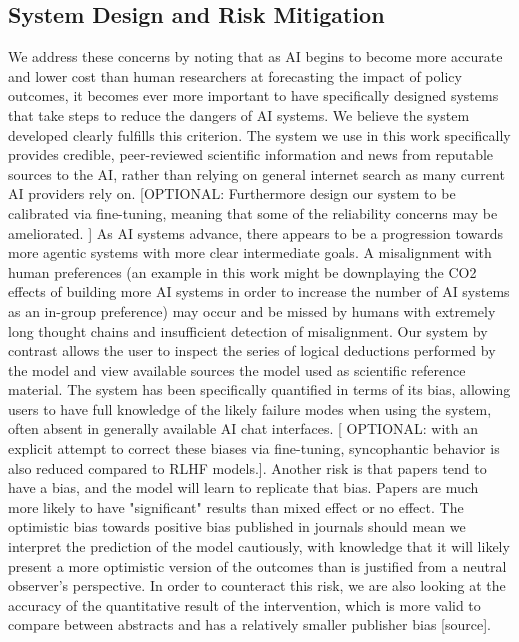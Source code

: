 \documentclass[12pt,a4paper]{article}
\begin{document}
\subsection{System Design and Risk Mitigation}
We address these concerns by noting that as AI begins to become more accurate and lower cost than human researchers at forecasting the impact of policy outcomes, it becomes ever more important to have specifically designed systems that take steps to reduce the dangers of AI systems. We believe the system developed clearly fulfills this criterion. The system we use in this work specifically provides credible, peer-reviewed scientific information and news from reputable sources to the AI, rather than relying on general internet search as many current AI providers rely on.   [OPTIONAL: Furthermore design our system to be calibrated via fine-tuning, meaning that some of the reliability concerns may be ameliorated. ] As AI systems advance, there appears to be a progression towards more agentic systems with more clear intermediate goals. A misalignment with human preferences (an example in this work might be downplaying the CO2 effects of building more AI systems in order to increase the number of AI systems as an in-group preference) may occur and be missed by humans with extremely long thought chains and insufficient detection of misalignment. Our system by contrast allows the user to inspect the series of logical deductions performed by the model and view available sources the model used as scientific reference material. The system has been specifically quantified in terms of its bias, allowing users to have full knowledge of the likely failure modes when using the system, often absent in generally available AI chat interfaces. [ OPTIONAL: with an explicit attempt to correct these biases via fine-tuning, syncophantic behavior is also reduced compared to RLHF models.].
Another risk is that papers tend to have a bias, and the model will learn to replicate that bias. Papers are much more likely to have "significant" results than mixed effect or no effect. The optimistic bias towards positive bias published in journals should mean we interpret the prediction of the model cautiously, with knowledge that it will likely present a more optimistic version of the outcomes than is justified from a neutral observer's perspective. In order to counteract this risk, we are also looking at the accuracy of the quantitative result of the intervention, which is more valid to compare between abstracts and has a relatively smaller publisher bias [source]. 
\end{document}
